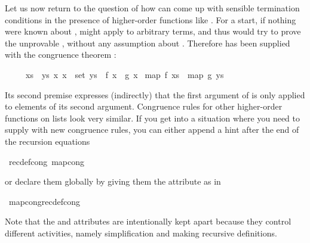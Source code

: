 \begin{isabellebody}
\begin{isamarkuptext}
Let us now return to the question of how  can come up with
sensible termination conditions in the presence of higher-order functions
like . For a start, if nothing were known about ,
 might apply  to arbitrary terms, and thus
 would try to prove the unprovable , without any assumption about .  Therefore
 has been supplied with the congruence theorem
:
\begin{isabelle}%
\ \ \ \ \ {\isasymlbrakk}xs\ {\isacharequal}\ ys{\isacharsemicolon}\ {\isasymAnd}x{\isachardot}\ x\ {\isasymin}\ set\ ys\ {\isasymLongrightarrow}\ f\ x\ {\isacharequal}\ g\ x{\isasymrbrakk}\isanewline
\isaindent{\ \ \ \ \ }{\isasymLongrightarrow}\ map\ f\ xs\ {\isacharequal}\ map\ g\ ys%
\end{isabelle}
Its second premise expresses (indirectly) that the first argument of
 is only applied to elements of its second argument. Congruence
rules for other higher-order functions on lists look very similar. If you get
into a situation where you need to supply  with new
congruence rules, you can either append a hint after the end of
the recursion equations%
\end{isamarkuptext}%
{\isacharparenleft}\ recdef{\isacharunderscore}cong{\isacharcolon}\ map{\isacharunderscore}cong{\isacharparenright}%
\begin{isamarkuptext}%
\noindent
or declare them globally
by giving them the  attribute as in%
\end{isamarkuptext}%
\ map{\isacharunderscore}cong{\isacharbrackleft}recdef{\isacharunderscore}cong{\isacharbrackright}%
\begin{isamarkuptext}%
Note that the  and  attributes are
intentionally kept apart because they control different activities, namely
simplification and making recursive definitions.
\end{isamarkuptext}%
\end{isabellebody}%
